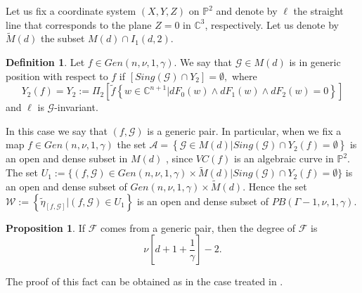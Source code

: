 \documentclass{amsart}
\theoremstyle{definition}
\newtheorem{definition}[theorem]{Definition}
\theoremstyle{proposition}
\newtheorem{proposition}[theorem]{Proposition}
\numberwithin{equation}{section}
\theoremstyle{main}
\begin{document}
Let us fix a coordinate system $(X,Y,Z)$ on $\mathbb P^2$ and denote by $\ell$ the straight line that corresponds to the plane $Z=0$ in $\mathbb C^3$, respectively.
Let us denote by $\tilde M\left(d\right)$ the subset $M\left(d\right)\cap I_1(d,2)$.
\begin{definition} Let $f \in Gen\left(n,\nu,1,\gamma\right)$. We say that  
$\mathcal G \in M\left(d\right)$ is in generic position with respect to $f$ if $\left[Sing\left(\mathcal G\right)\cap Y_{2}\right]=\emptyset,$ where 
$$Y_{2}(f)=Y_{2}:=\displaystyle\Pi_2\left[\tilde{f}\left\{w \in \mathbb C^{n+1} |dF_{0}\left(w\right)\wedge dF_{1}\left(w\right)\wedge dF_{2}\left(w\right) = 0\right\}\right]$$ and  $\ell$ is $\mathcal G$-invariant.
\end{definition}

In this case we say that $\left(f,\mathcal{G}\right)$ is a generic pair. In particular, when we fix a map $f\in Gen(n,\nu,1,\gamma)$ the set $\mathcal{A}=\left\{\mathcal{G} \in M\left(d\right) | Sing\left(\mathcal G\right) \cap Y_{2}(f)= \emptyset \right\}$ is an open and dense subset in $M(d)$ \cite{lnsc}, since $VC(f)$ {is an algebraic curve in}  ${\mathbb P^2}.$ The set $U_{1}:=\{ (f,\mathcal G) \in Gen(n,\nu,1,\gamma)\times\tilde M\left(d\right)| Sing\left(\mathcal G\right)\cap Y_{2}(f)= \emptyset \}$ is an open and dense subset of $Gen(n,\nu,1,\gamma)\times\tilde M\left(d\right)$. Hence the set $\mathcal W:=\left\{\tilde\eta_{[f,\mathcal G]}| \left(f,\mathcal G\right)\in U_{1}\right\}$ is an open and dense subset of $PB\left(\Gamma-1,\nu,1,\gamma\right)$.
    \begin{proposition} \label{graupargenerico}If $\mathcal F$ comes from a generic pair, then the degree of $\mathcal F$ is $$\nu\left[d+1+\frac{1}{\gamma}\right] - 2.$$ 
   \end{proposition}
  The proof of this fact can be obtained as in the case treated in \cite{cs}.
\end{document}
